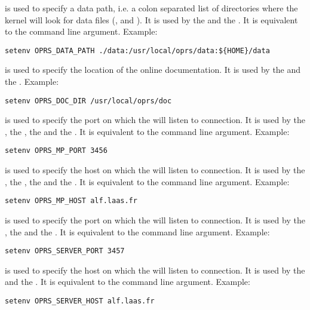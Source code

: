 \begin{description}

\item[\code{OPRS\_DATA\_PATH}] is used  to specify a data path, i.e. a colon separated
list of directories where the kernel will look for data files (,
 and ). It is used by the \CPK{} and the \XPK{}. It is
equivalent to the  command line argument.\*
Example:
\begin{verbatim}
setenv OPRS_DATA_PATH ./data:/usr/local/oprs/data:${HOME}/data
\end{verbatim}

\item[\code{OPRS\_DOC\_DIR}] is used  to specify the location of the online \COPRSDE{}
documentation. It is used by the \XPK{} and the \OPE{}.
Example:
\begin{verbatim}
setenv OPRS_DOC_DIR /usr/local/oprs/doc
\end{verbatim}

\item[\code{OPRS\_MP\_PORT}] is used  to specify the port on which the \MPA{} will
listen to connection. It is used by the \CPK{}, the \XPK{}, the \OPRSS{}
and the \MPA{}. It is equivalent to the  command line argument. \*
Example:
\begin{verbatim}
setenv OPRS_MP_PORT 3456
\end{verbatim}

\item[\code{OPRS\_MP\_HOST}] is used  to specify the host on which the \MPA{} will
listen to connection. It is used by the \CPK{}, the \XPK{}, the \MPA{} and the
\OPRSS{}. It is equivalent to the  command line argument.\*
Example:
\begin{verbatim}
setenv OPRS_MP_HOST alf.laas.fr
\end{verbatim}

\item[\code{OPRS\_SERVER\_PORT}] is used to specify the port on which the
\OPRSS{} will listen to connection. It is used by the \CPK{}, the \XPK{}
and the \OPRSS{}. It is equivalent to the  command line argument.\*
Example:
\begin{verbatim}
setenv OPRS_SERVER_PORT 3457
\end{verbatim}

\item[\code{OPRS\_SERVER\_HOST}] is used to specify the host on which the
\OPRSS{} will listen to connection. It is used by the \CPK{} and the
\XPK{}. It is equivalent to the  command line argument.\*
Example:
\begin{verbatim}
setenv OPRS_SERVER_HOST alf.laas.fr
\end{verbatim}


\end{description}
